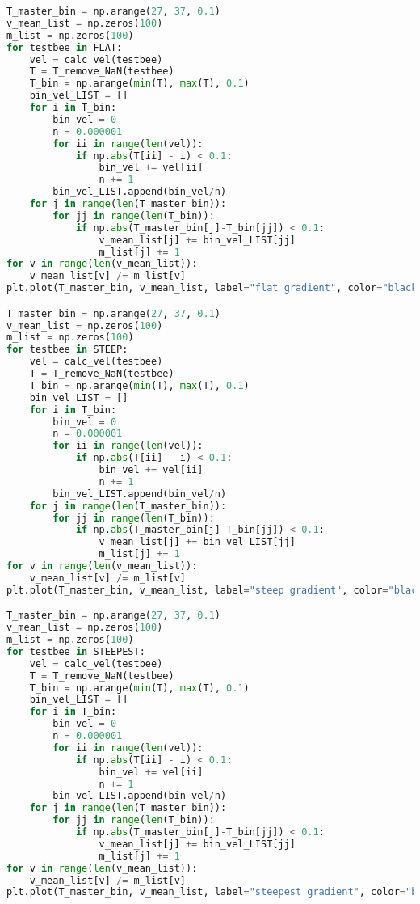 \begin{lstlisting}[language=Python, basicstyle=\tiny, frame=single, keywordstyle=\color{teal}, commentstyle=\color{olive}, stringstyle=\color{red}]
T_master_bin = np.arange(27, 37, 0.1)
v_mean_list = np.zeros(100)
m_list = np.zeros(100)
for testbee in FLAT:
    vel = calc_vel(testbee)
    T = T_remove_NaN(testbee)
    T_bin = np.arange(min(T), max(T), 0.1)
    bin_vel_LIST = []
    for i in T_bin:
        bin_vel = 0
        n = 0.000001
        for ii in range(len(vel)):
            if np.abs(T[ii] - i) < 0.1:
                bin_vel += vel[ii]
                n += 1
        bin_vel_LIST.append(bin_vel/n)
    for j in range(len(T_master_bin)):
        for jj in range(len(T_bin)):
            if np.abs(T_master_bin[j]-T_bin[jj]) < 0.1:
                v_mean_list[j] += bin_vel_LIST[jj]
                m_list[j] += 1
for v in range(len(v_mean_list)):
    v_mean_list[v] /= m_list[v]
plt.plot(T_master_bin, v_mean_list, label="flat gradient", color="black", linestyle="dotted")

T_master_bin = np.arange(27, 37, 0.1)
v_mean_list = np.zeros(100)
m_list = np.zeros(100)
for testbee in STEEP:
    vel = calc_vel(testbee)
    T = T_remove_NaN(testbee)
    T_bin = np.arange(min(T), max(T), 0.1)
    bin_vel_LIST = []
    for i in T_bin:
        bin_vel = 0
        n = 0.000001
        for ii in range(len(vel)):
            if np.abs(T[ii] - i) < 0.1:
                bin_vel += vel[ii]
                n += 1
        bin_vel_LIST.append(bin_vel/n)
    for j in range(len(T_master_bin)):
        for jj in range(len(T_bin)):
            if np.abs(T_master_bin[j]-T_bin[jj]) < 0.1:
                v_mean_list[j] += bin_vel_LIST[jj]
                m_list[j] += 1
for v in range(len(v_mean_list)):
    v_mean_list[v] /= m_list[v]
plt.plot(T_master_bin, v_mean_list, label="steep gradient", color="black", linestyle="dashed")

T_master_bin = np.arange(27, 37, 0.1)
v_mean_list = np.zeros(100)
m_list = np.zeros(100)
for testbee in STEEPEST:
    vel = calc_vel(testbee)
    T = T_remove_NaN(testbee)
    T_bin = np.arange(min(T), max(T), 0.1)
    bin_vel_LIST = []
    for i in T_bin:
        bin_vel = 0
        n = 0.000001
        for ii in range(len(vel)):
            if np.abs(T[ii] - i) < 0.1:
                bin_vel += vel[ii]
                n += 1
        bin_vel_LIST.append(bin_vel/n)
    for j in range(len(T_master_bin)):
        for jj in range(len(T_bin)):
            if np.abs(T_master_bin[j]-T_bin[jj]) < 0.1:
                v_mean_list[j] += bin_vel_LIST[jj]
                m_list[j] += 1
for v in range(len(v_mean_list)):
    v_mean_list[v] /= m_list[v]
plt.plot(T_master_bin, v_mean_list, label="steepest gradient", color="black", linestyle="dashdot")


\end{lstlisting}
